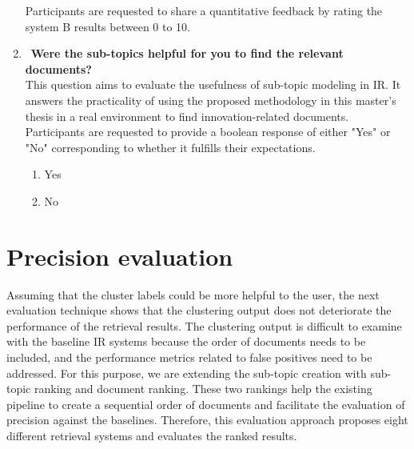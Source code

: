 \begin{enumerate}
	Participants are requested to share a quantitative feedback by rating the system B results between 0 to 10.
	
	\item ~\textbf{Were the sub-topics helpful for you to find the relevant documents?} \\
	
This question aims to evaluate the usefulness of sub-topic modeling in \ac{IR}. It answers the practicality of using the proposed methodology in this master's thesis in a real environment to find innovation-related documents. Participants are requested to provide a boolean response of either "Yes" or "No" corresponding to whether it fulfills their expectations.

	
	\begin{enumerate}
		\item Yes
		\item No
	\end{enumerate}
	
\end{enumerate}

\section{Precision evaluation}

Assuming that the cluster labels could be more helpful to the user, the next evaluation technique shows that the clustering output does not deteriorate the performance of the retrieval results. The clustering output is difficult to examine with the baseline \ac{IR} systems because the order of documents needs to be included, and the performance metrics related to false positives need to be addressed. For this purpose, we are extending the sub-topic creation with sub-topic ranking and document ranking. These two rankings help the existing pipeline to create a sequential order of documents and facilitate the evaluation of precision against the baselines. Therefore, this evaluation approach proposes eight different retrieval systems and evaluates the ranked results.


